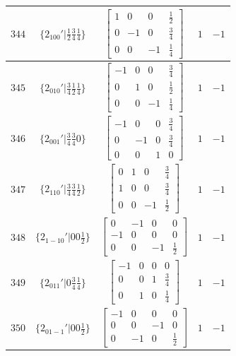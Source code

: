 \documentclass[fleqn,8pt]{jsarticle}
\begin{document}
\begin{longtable}{ccccc}
$ 344 $ & $ \{2{}_{100}{}'|\frac{1}{2} \frac{3}{4} \frac{1}{4}\} $ & $ \begin{bmatrix} 1 & 0 & 0 & \frac{1}{2} \\ 0 & -1 & 0 & \frac{3}{4} \\ 0 & 0 & -1 & \frac{1}{4} \end{bmatrix} $ & $ 1 $ & $ -1 $ \\ \hline
$ 345 $ & $ \{2{}_{010}{}'|\frac{3}{4} \frac{1}{2} \frac{1}{4}\} $ & $ \begin{bmatrix} -1 & 0 & 0 & \frac{3}{4} \\ 0 & 1 & 0 & \frac{1}{2} \\ 0 & 0 & -1 & \frac{1}{4} \end{bmatrix} $ & $ 1 $ & $ -1 $ \\ \hline
$ 346 $ & $ \{2{}_{001}{}'|\frac{3}{4} \frac{3}{4} 0\} $ & $ \begin{bmatrix} -1 & 0 & 0 & \frac{3}{4} \\ 0 & -1 & 0 & \frac{3}{4} \\ 0 & 0 & 1 & 0 \end{bmatrix} $ & $ 1 $ & $ -1 $ \\ \hline
$ 347 $ & $ \{2{}_{110}{}'|\frac{3}{4} \frac{3}{4} \frac{1}{2}\} $ & $ \begin{bmatrix} 0 & 1 & 0 & \frac{3}{4} \\ 1 & 0 & 0 & \frac{3}{4} \\ 0 & 0 & -1 & \frac{1}{2} \end{bmatrix} $ & $ 1 $ & $ -1 $ \\ \hline
$ 348 $ & $ \{2{}_{1-10}{}'|0 0 \frac{1}{2}\} $ & $ \begin{bmatrix} 0 & -1 & 0 & 0 \\ -1 & 0 & 0 & 0 \\ 0 & 0 & -1 & \frac{1}{2} \end{bmatrix} $ & $ 1 $ & $ -1 $ \\ \hline
$ 349 $ & $ \{2{}_{011}{}'|0 \frac{3}{4} \frac{1}{4}\} $ & $ \begin{bmatrix} -1 & 0 & 0 & 0 \\ 0 & 0 & 1 & \frac{3}{4} \\ 0 & 1 & 0 & \frac{1}{4} \end{bmatrix} $ & $ 1 $ & $ -1 $ \\ \hline
$ 350 $ & $ \{2{}_{01-1}{}'|0 0 \frac{1}{2}\} $ & $ \begin{bmatrix} -1 & 0 & 0 & 0 \\ 0 & 0 & -1 & 0 \\ 0 & -1 & 0 & \frac{1}{2} \end{bmatrix} $ & $ 1 $ & $ -1 $ \\ \hline

\end{longtable}
\end{document}
